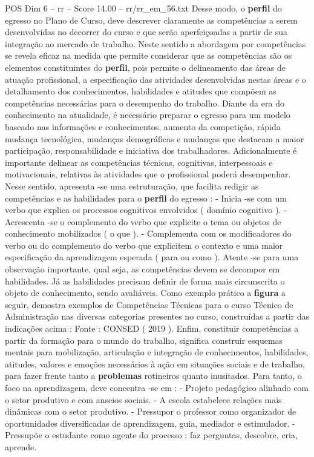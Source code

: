 \begin{textsample}{POS Dim 6 – rr – Score 14.00 – rr/rr\_em\_56.txt}
Desse modo, o \textbf{perfil} do egresso no Plano de Curso, deve descrever claramente as competências a serem desenvolvidas no decorrer do curso e que serão aperfeiçoadas a partir de sua integração ao mercado de trabalho.
Neste sentido a abordagem por competências se revela eficaz na medida que permite considerar que as competências são os elementos constituintes do \textbf{perfil}, pois permite o delineamento das áreas de atuação profissional, a especificação das atividades desenvolvidas nestas áreas e o detalhamento dos conhecimentos, habilidades e atitudes que compõem as competências necessárias para o desempenho do trabalho.
Diante da era do conhecimento na atualidade, é necessário preparar o egresso para um modelo baseado nas informações e conhecimentos, aumento da competição, rápida mudança tecnológica, mudanças demográficas e mudanças que destacam a maior participação, responsabilidade e iniciativa dos trabalhadores.
Adicionalmente é importante delinear as competências técnicas, cognitivas, interpessoais e motivacionais, relativas às atividades que o profissional poderá desempenhar.
Nesse sentido, apresenta -se uma estruturação, que facilita redigir as competências e as habilidades para o \textbf{perfil} do egresso : - Inicia -se com um verbo que explica os processos cognitivos envolvidos ( domínio cognitivo ). - Acrescenta -se o complemento do verbo que explicite o tema ou objetos de conhecimento mobilizados ( o que ). - Complementa com os modificadores do verbo ou do complemento do verbo que explicitem o contexto e uma maior especificação da aprendizagem esperada ( para ou como ).
Atente -se para uma observação importante, qual seja, as competências devem se decompor em habilidades.
Já as habilidades precisam definir de forma mais circunscrita o objeto de conhecimento, sendo avaliáveis.
Como exemplo prático a \textbf{figura} a seguir, demostra exemplos de Competências Técnicas para o curso Técnico de Administração nas diversas categorias presentes no curso, construídas a partir das indicações acima : Fonte : CONSED ( 2019 ).
Enfim, constituir competências a partir da formação para o mundo do trabalho, significa construir esquemas mentais para mobilização, articulação e integração de conhecimentos, habilidades, atitudes, valores e emoções necessários à ação em situações sociais e de trabalho, para fazer frente tanto a \textbf{problemas} rotineiros quanto inusitados.
Para tanto, o foco na aprendizagem, deve concentra -se em : - Projeto pedagógico alinhado com o setor produtivo e com anseios sociais. - A escola estabelece relações mais dinâmicas com o setor produtivo. - Pressupor o professor como organizador de oportunidades diversificadas de aprendizagem, guia, mediador e estimulador. - Pressupõe o estudante como agente do processo : faz perguntas, descobre, cria, aprende.

\end{textsample}
